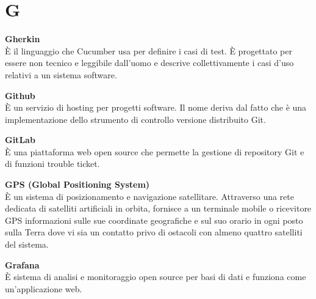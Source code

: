 \section{G}
\textbf{Gherkin}\\
È il linguaggio che Cucumber usa per definire i casi di test. È progettato per essere non tecnico e leggibile dall'uomo e descrive collettivamente i casi d'uso relativi a un sistema software.

\textbf{Github}\\
È un servizio di hosting per progetti software. Il nome deriva dal fatto che è una implementazione dello strumento di controllo versione distribuito Git.

\textbf{GitLab}\\
È una piattaforma web open source che permette la gestione di repository Git e di funzioni trouble ticket.

\textbf{GPS (Global Positioning System)}\\
È un sistema di posizionamento e navigazione satellitare. Attraverso una rete dedicata di satelliti artificiali in orbita, fornisce a un terminale mobile o ricevitore GPS informazioni sulle sue coordinate geografiche e sul suo orario in ogni posto sulla Terra dove vi sia un contatto privo di ostacoli con almeno quattro satelliti del sistema.

\textbf{Grafana}\\
È sistema di analisi e monitoraggio open source per basi di dati e funziona come un'applicazione web.

\clearpage